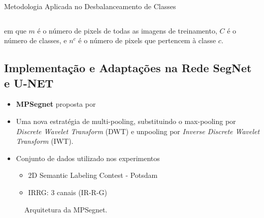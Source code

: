 \documentclass[%
  10pt,%
  aspectratio = 169,%
  compress,%
  t,%
  english,%
  brazilian,%
  tikz,
]{beamer}
\begin{document}
\begin{frame}{Metodologia Aplicada no Desbalanceamento de Classes}
\begin{columns}[T]
\end{columns}

\noindent
em que $m$ é o número de pixels de todas as imagens de treinamento, $C$ é o número de classes, e $n^c$ é o número de pixels que pertencem à classe $c$.

\end{frame}

\subsection{Implementação e Adaptações na Rede SegNet e U-NET}\label{ssec:matmet6}

\begin{frame}

\begin{itemize}
    \item \textbf{MPSegnet} proposta por \textcite{SOUZA BRITO et al., 2021}
    \item Uma nova estratégia de multi-pooling, substituindo o max-pooling por \textit{Discrete Wavelet Transform} (DWT) e unpooling por \textit{Inverse Discrete Wavelet Transform} (IWT).
    \item Conjunto de dados utilizado nos experimentos
    \begin{itemize}
        \item 2D Semantic Labeling Contest - Potsdam 
        \item IRRG: 3 canais (IR-R-G)
    \end{itemize}
\end{itemize}

\begin{figure}[!htb]
\centering%
\caption{Arquitetura da MPSegnet.}%
\label{fig:graficoxy1}
\end{figure}

\end{frame}
\end{document}
